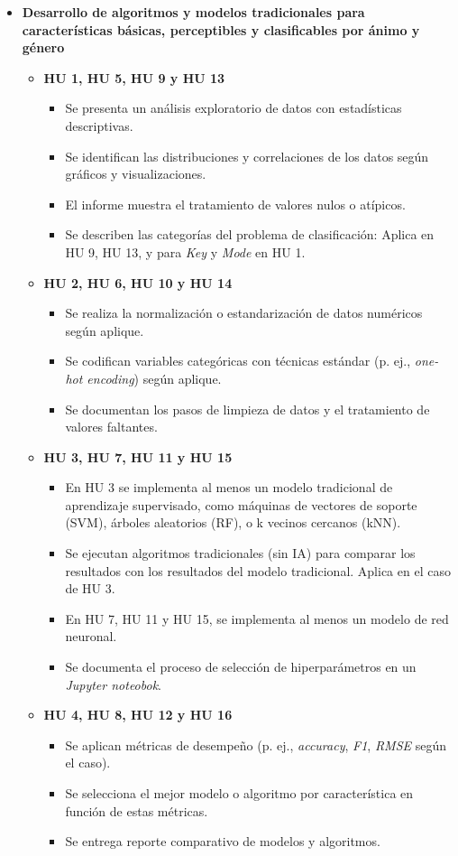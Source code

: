 \documentclass[
11pt, %
]{charter}
\begin{document}
\begin{itemize}
  \item \textbf{Desarrollo de algoritmos y modelos tradicionales para características básicas, perceptibles y clasificables por ánimo y género}
    \begin{itemize}
      \item \textbf{HU 1, HU 5, HU 9 y HU 13}
      \begin{itemize}
        \item Se presenta un análisis exploratorio de datos con estadísticas descriptivas.
        \item Se identifican las distribuciones y correlaciones de los datos según gráficos y visualizaciones.
        \item El informe muestra el tratamiento de valores nulos o atípicos.
        \item Se describen las categorías del problema de clasificación: Aplica en HU 9, HU 13, y para \textit{Key} y \textit{Mode} en HU 1.
      \end{itemize}
      \item \textbf{HU 2, HU 6, HU 10 y HU 14}
      \begin{itemize}
        \item Se realiza la normalización o estandarización de datos numéricos según aplique.
        \item Se codifican variables categóricas con técnicas estándar (p. ej., \textit{one-hot encoding}) según aplique.
        \item Se documentan los pasos de limpieza de datos y el tratamiento de valores faltantes.
      \end{itemize}
      \item \textbf{HU 3, HU 7, HU 11 y HU 15}
      \begin{itemize}
        \item En HU 3 se implementa al menos un modelo tradicional de aprendizaje supervisado, como máquinas de vectores de soporte (SVM), árboles aleatorios (RF), o k vecinos cercanos (kNN).
        \item Se ejecutan algoritmos tradicionales (sin IA) para comparar los resultados con los resultados del modelo tradicional. Aplica en el caso de HU 3.
        \item En HU 7, HU 11 y HU 15, se implementa al menos un modelo de red neuronal.
        \item Se documenta el proceso de selección de hiperparámetros en un \textit{Jupyter noteobok}.
      \end{itemize}
      \item \textbf{HU 4, HU 8, HU 12 y HU 16}
      \begin{itemize}
        \item Se aplican métricas de desempeño (p. ej., \textit{accuracy}, \textit{F1}, \textit{RMSE} según el caso).
        \item Se selecciona el mejor modelo o algoritmo por característica en función de estas métricas.
        \item Se entrega reporte comparativo de modelos y algoritmos.
      \end{itemize}
    \end{itemize}


\end{itemize}
\end{document}
